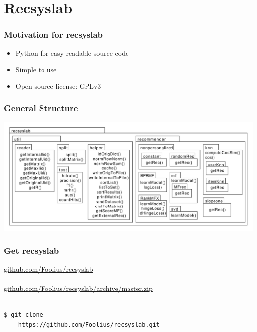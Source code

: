 \documentclass[mathserif,svgnames]{beamer}
\begin{document}
\section{Recsyslab}
\begin{frame} 
\frametitle{Motivation for recsyslab}\pause
\begin{itemize}
    \item Python for easy readable source code\pause
    \item Simple to use\pause
    \item Open source license: GPLv3
\end{itemize}
\end{frame}
\begin{frame}
\frametitle{General Structure}
\begin{centering}
    \includegraphics[page=1, scale=0.34]{packagediagram.pdf}
\end{centering}
\end{frame}
\begin{frame}[fragile]
    \frametitle{Get recsyslab}
    \url{github.com/Foolius/recsyslab}\\
    \hspace*{8cm}\\
    \url{github.com/Foolius/recsyslab/archive/master.zip}\\
    \hspace*{8cm}\\
    \begin{lstlisting}[style=pseudocode]
$ git clone 
    https://github.com/Foolius/recsyslab.git
    \end{lstlisting}
\end{frame}
\end{document}
